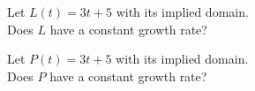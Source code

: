 \documentclass{ximera}
\begin{document}
\begin{exercise}

Let $L(t) = 3t + 5$ with its implied domain. \\
Does $L$ have a constant growth rate?

\begin{multipleChoice}
\end{multipleChoice}

\end{exercise}





\begin{exercise}

Let $P(t) = 3t + 5$ with its implied domain. \\
Does $P$ have a constant growth rate?

\begin{multipleChoice}
\end{multipleChoice}

\end{exercise}
\end{document}
